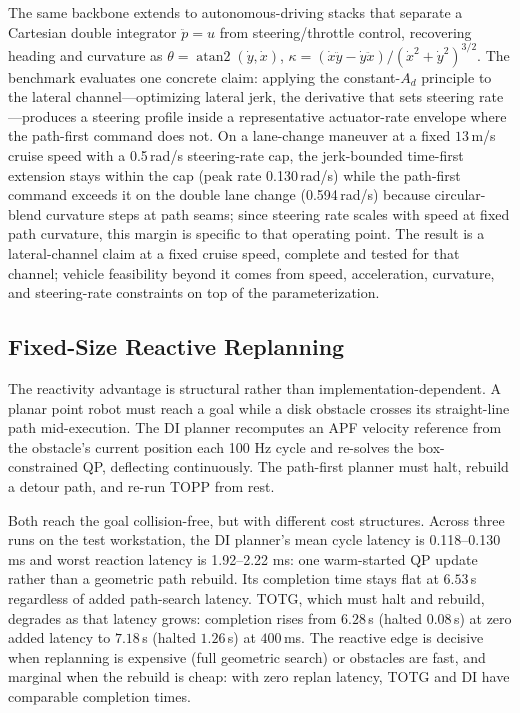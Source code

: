 The same backbone extends to autonomous-driving stacks that separate a
Cartesian double integrator \(\ddot p=u\) from steering/throttle control,
recovering heading and curvature as
\(\theta=\operatorname{atan2}(\dot y,\dot x)\),
\(\kappa=(\dot x\ddot y-\dot y\ddot x)/(\dot x^2+\dot y^2)^{3/2}\). The
benchmark evaluates one concrete claim: applying the constant-\(A_d\)
principle to the lateral channel---optimizing lateral jerk, the
derivative that sets steering rate---produces a steering profile inside a
representative actuator-rate envelope where the path-first command does not.
On a lane-change maneuver at a fixed \(13\)\,m/s cruise speed with a
0.5\,rad/s steering-rate cap, the jerk-bounded time-first extension stays
within the cap (peak rate 0.130\,rad/s) while the path-first command
exceeds it on the double lane change (0.594\,rad/s) because
circular-blend curvature steps at path seams; since steering rate scales
with speed at fixed path curvature, this margin is specific to that
operating point. The result is a lateral-channel claim at a fixed cruise
speed, complete and tested for that channel; vehicle feasibility beyond
it comes from speed, acceleration, curvature, and steering-rate
constraints on top of the parameterization.

\subsection{Fixed-Size Reactive
Replanning}\label{d.-bounded-latency-reactive-replanning}

The reactivity advantage is structural rather than
implementation-dependent. A planar point robot must reach a goal while a
disk obstacle crosses its straight-line path mid-execution. The DI
planner recomputes an APF velocity reference from the obstacle's current
position each 100 Hz cycle and re-solves the box-constrained QP,
deflecting continuously. The path-first planner must halt, rebuild a
detour path, and re-run TOPP from rest.

Both reach the goal collision-free, but with different cost structures.
Across three runs on the test workstation, the DI planner's mean cycle
latency is 0.118--0.130 ms and worst reaction latency is 1.92--2.22 ms:
one warm-started QP update rather than a geometric path rebuild. Its
completion time stays flat at \(6.53\)\,s regardless of added path-search latency. TOTG,
which must halt and rebuild, degrades as that latency grows: completion
rises from \(6.28\)\,s (halted \(0.08\)\,s) at zero added latency to
\(7.18\)\,s (halted \(1.26\)\,s) at \(400\)\,ms. The reactive edge is
decisive when replanning is expensive (full geometric search) or
obstacles are fast, and marginal when the rebuild is cheap: with zero
replan latency, TOTG and DI have comparable completion times.

